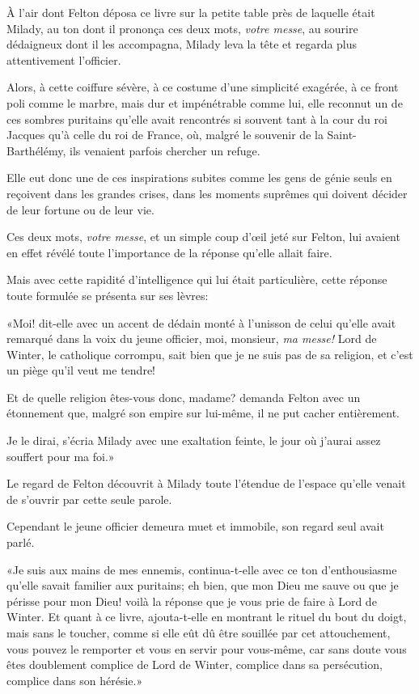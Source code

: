 À l'air dont Felton déposa ce livre sur la petite table près de laquelle était Milady, au ton dont il prononça ces deux mots, \textit{votre messe}, au sourire dédaigneux dont il les accompagna, Milady leva la tête et regarda plus attentivement l'officier. 

Alors, à cette coiffure sévère, à ce costume d'une simplicité exagérée, à ce front poli comme le marbre, mais dur et impénétrable comme lui, elle reconnut un de ces sombres puritains qu'elle avait rencontrés si souvent tant à la cour du roi Jacques qu'à celle du roi de France, où, malgré le souvenir de la Saint-Barthélémy, ils venaient parfois chercher un refuge. 

Elle eut donc une de ces inspirations subites comme les gens de génie seuls en reçoivent dans les grandes crises, dans les moments suprêmes qui doivent décider de leur fortune ou de leur vie. 

Ces deux mots, \textit{votre messe}, et un simple coup d'œil jeté sur Felton, lui avaient en effet révélé toute l'importance de la réponse qu'elle allait faire. 

Mais avec cette rapidité d'intelligence qui lui était particulière, cette réponse toute formulée se présenta sur ses lèvres: 

«Moi! dit-elle avec un accent de dédain monté à l'unisson de celui qu'elle avait remarqué dans la voix du jeune officier, moi, monsieur, \textit{ma messe!} Lord de Winter, le catholique corrompu, sait bien que je ne suis pas de sa religion, et c'est un piège qu'il veut me tendre! 

\speak  Et de quelle religion êtes-vous donc, madame? demanda Felton avec un étonnement que, malgré son empire sur lui-même, il ne put cacher entièrement. 

\speak  Je le dirai, s'écria Milady avec une exaltation feinte, le jour où j'aurai assez souffert pour ma foi.» 

Le regard de Felton découvrit à Milady toute l'étendue de l'espace qu'elle venait de s'ouvrir par cette seule parole. 

Cependant le jeune officier demeura muet et immobile, son regard seul avait parlé. 

«Je suis aux mains de mes ennemis, continua-t-elle avec ce ton d'enthousiasme qu'elle savait familier aux puritains; eh bien, que mon Dieu me sauve ou que je périsse pour mon Dieu! voilà la réponse que je vous prie de faire à Lord de Winter. Et quant à ce livre, ajouta-t-elle en montrant le rituel du bout du doigt, mais sans le toucher, comme si elle eût dû être souillée par cet attouchement, vous pouvez le remporter et vous en servir pour vous-même, car sans doute vous êtes doublement complice de Lord de Winter, complice dans sa persécution, complice dans son hérésie.» 

